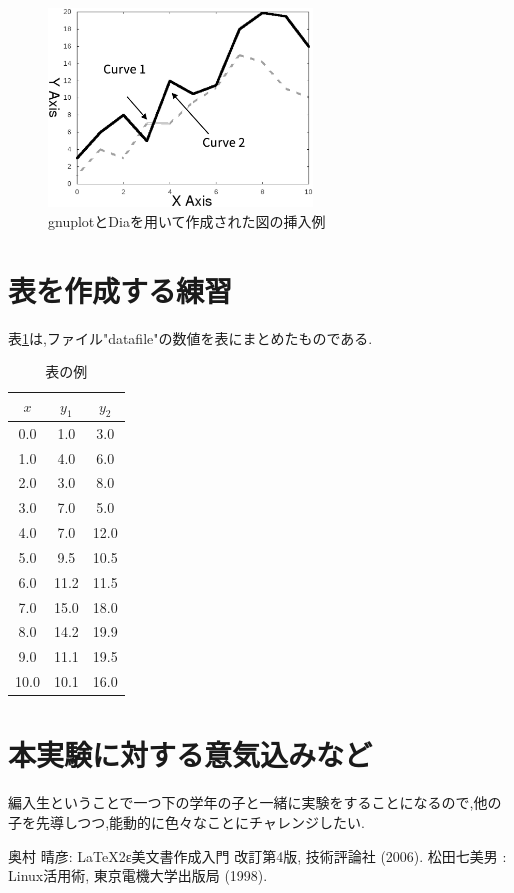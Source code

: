 \documentclass{jarticle}
\begin{document}
\begin{figure}
\begin{center}
\includegraphics[width=7.0cm]{graph.eps}
\caption{gnuplotとDiaを用いて作成された図の挿入例}
\label{fig:graph}
\end{center}
\end{figure}

\section{表を作成する練習}
表\ref{table:datafile}は,ファイル"datafile"の数値を表にまとめたものである.

\begin{table}
\caption{表の例}
\label{table:datafile}
\begin{center}
\begin{tabular}{|c|c|c|}\hline
$x$ & $y_{1}$ & $y_{2}$ \\ \hline
0.0 & 1.0 & 3.0 \\ \hline
1.0 & 4.0 & 6.0 \\ \hline
2.0 & 3.0 & 8.0 \\ \hline
3.0 & 7.0 & 5.0 \\\hline
4.0 & 7.0 & 12.0 \\\hline
5.0 & 9.5 & 10.5 \\\hline
6.0 & 11.2 & 11.5 \\\hline
7.0 & 15.0 & 18.0 \\\hline
8.0 & 14.2 & 19.9 \\\hline
9.0 & 11.1 & 19.5 \\\hline
10.0 & 10.1 & 16.0 \\\hline
\end{tabular}
\end{center}
\end{table}

\section{本実験に対する意気込みなど}
編入生ということで一つ下の学年の子と一緒に実験をすることになるので,他の子を先導しつつ,能動的に色々なことにチャレンジしたい.

\begin{thebibliography}{99}
%
 奥村 晴彦: LaTeX2ε美文書作成入門 改訂第4版,  技術評論社 (2006).
%
 松田七美男 : Linux活用術, 東京電機大学出版局 (1998).
%
\end{thebibliography}
\end{document}
